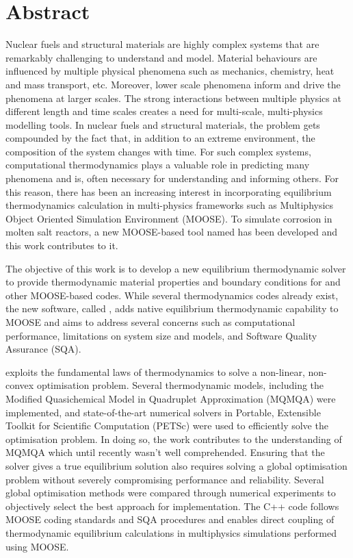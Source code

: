 \chapter*{Abstract}

Nuclear fuels and structural materials are highly complex systems that are remarkably challenging to understand and model. Material behaviours are influenced by multiple physical phenomena such as mechanics, chemistry, heat and mass transport, etc. Moreover, lower scale phenomena inform and drive the phenomena at larger scales. The strong interactions between multiple physics at different length and time scales creates a need for multi-scale, multi-physics modelling tools. In nuclear fuels and structural materials, the problem gets compounded by the fact that, in addition to an extreme environment, the composition of the system changes with time. For such complex systems, computational thermodynamics plays a valuable role in predicting many phenomena and is, often necessary for understanding and informing others. For this reason, there has been an increasing interest in incorporating equilibrium thermodynamics calculation in multi-physics frameworks such as Multiphysics Object Oriented Simulation Environment (MOOSE). To simulate corrosion in molten salt reactors, a new MOOSE-based tool named {\YJ} has been developed and this work contributes to it.

The objective of this work is to develop a new equilibrium thermodynamic solver to provide thermodynamic material properties and boundary conditions for {\YJ} and other MOOSE-based codes. While several thermodynamics codes already exist, the new software, called {\GEM}, adds native equilibrium thermodynamic capability to MOOSE and aims to address several concerns such as computational performance, limitations on system size and models, and Software Quality Assurance (SQA).

{\GEM} exploits the fundamental laws of thermodynamics to solve a non-linear, non-convex optimisation problem. Several thermodynamic models, including the Modified Quasichemical Model in Quadruplet Approximation (MQMQA) were implemented, and state-of-the-art numerical solvers in Portable, Extensible Toolkit for Scientific Computation (PETSc) were used to efficiently solve the optimisation problem. In doing so, the work contributes to the understanding of MQMQA which until recently wasn't well comprehended. Ensuring that the solver gives a true equilibrium solution also requires solving a global optimisation problem without severely compromising performance and reliability. Several global optimisation methods were compared through numerical experiments to objectively select the best approach for implementation. The C++ code follows MOOSE coding standards and SQA procedures and enables direct coupling of thermodynamic equilibrium calculations in multiphysics simulations performed using MOOSE. 


